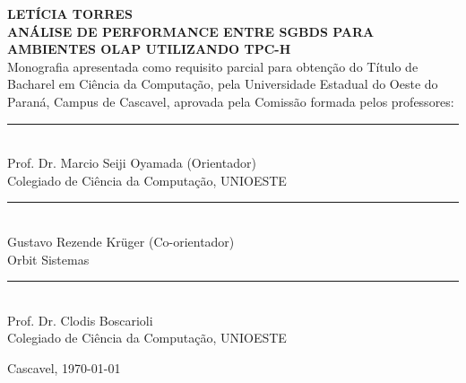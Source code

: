 

\begin{center}
\fontsize{12}{12}
\textbf{LETÍCIA TORRES}\\
\vspace{3cm}
\fontsize{14}{14}
\textbf{\MakeUppercase{Análise de Performance entre SGBDs para Ambientes OLAP Utilizando TPC-H}}\\
\vspace{3cm}
\fontsize{10}{10}
Monografia apresentada como requisito parcial para obtenção do Título de Bacharel em Ciência da Computação, pela Universidade Estadual do Oeste do Paraná, Campus de Cascavel, aprovada pela Comissão formada pelos professores:\\
\vspace{2cm}
\begin{flushright}
\begin{minipage}[10cm] {8.5cm}
\begin{center}
\rule{6cm}{0.01mm}\\
Prof. Dr. Marcio Seiji Oyamada (Orientador)\\
Colegiado de Ciência da Computação, UNIOESTE\\
\vspace{1cm}
\rule{6cm}{0.01mm}\\
Gustavo Rezende Krüger (Co-orientador)\\
Orbit Sistemas\\
\vspace{1cm}
\rule{6cm}{0.01mm}\\
Prof. Dr. Clodis Boscarioli\\
Colegiado de Ciência da Computação, UNIOESTE\\
\end{center}
\end{minipage}
\end{flushright}
\vspace{3cm}
Cascavel, \today
\end{center} 